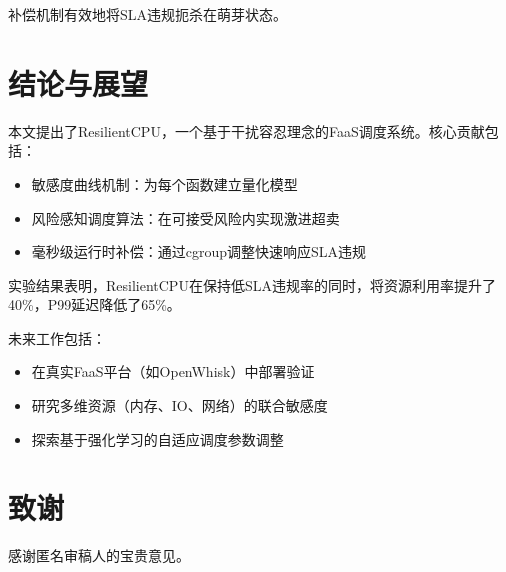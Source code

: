 \documentclass[11pt, a4paper, oneside]{article}
\begin{document}
补偿机制有效地将SLA违规扼杀在萌芽状态。

\section{结论与展望}

本文提出了ResilientCPU，一个基于干扰容忍理念的FaaS调度系统。核心贡献包括：

\begin{itemize}
    \item 敏感度曲线机制：为每个函数建立量化模型
    \item 风险感知调度算法：在可接受风险内实现激进超卖
    \item 毫秒级运行时补偿：通过cgroup调整快速响应SLA违规
\end{itemize}

实验结果表明，ResilientCPU在保持低SLA违规率的同时，将资源利用率提升了40\%，P99延迟降低了65\%。

未来工作包括：
\begin{itemize}
    \item 在真实FaaS平台（如OpenWhisk）中部署验证
    \item 研究多维资源（内存、IO、网络）的联合敏感度
    \item 探索基于强化学习的自适应调度参数调整
\end{itemize}

\section*{致谢}

感谢匿名审稿人的宝贵意见。


\end{document}
